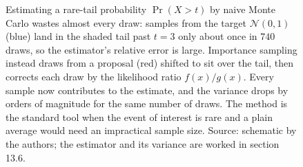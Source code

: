 \begin{figure}[htbp]
\centering
{}
\caption[Importance sampling for a rare tail]{Estimating a rare-tail
probability $\Pr(X>t)$ by naive Monte Carlo wastes almost every draw:
samples from the target $\mathcal{N}(0,1)$ (blue) land in the shaded tail
past $t=3$ only about once in $740$ draws, so the estimator's relative
error is large. Importance sampling instead draws from a proposal (red)
shifted to sit over the tail, then corrects each draw by the likelihood
ratio $f(x)/g(x)$. Every sample now contributes to the estimate, and the
variance drops by orders of magnitude for the same number of draws. The
method is the standard tool when the event of interest is rare and a
plain average would need an impractical sample size. Source: schematic by
the authors; the estimator and its variance are worked in section 13.6.}
\label{fig:vol02ch13:importance-sampling}
\end{figure}
